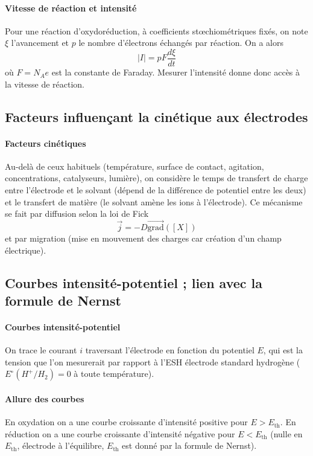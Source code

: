 \documentclass[french]{book}
\theoremstyle{plain}
\theoremstyle{definition}
\theoremstyle{remark}
\newcommand{\grad}{\overrightarrow{\text{grad}}}
\begin{document}
\paragraph{Vitesse de réaction et intensité} Pour une réaction d’oxydoréduction, à coefficients stœchiométriques fixés, on note $\xi$ l’avancement et $p$ le nombre d’électrons échangés par réaction. On a alors $$\lvert I\rvert=pF\frac{d\xi}{dt}$$ où $F=N_Ae$ est la constante de Faraday. Mesurer l’intensité donne donc accès à la vitesse de réaction.

\subsection{Facteurs influençant la cinétique aux électrodes}

\paragraph{Facteurs cinétiques} Au-delà de ceux habituels (température, surface de contact, agitation, concentrations, catalyseurs, lumière), on considère le temps de transfert de charge entre l’électrode et le solvant (dépend de la différence de potentiel entre les deux) et le transfert de matière (le solvant amène les ions à l’électrode). Ce mécanisme se fait par diffusion selon la loi de Fick $$\overrightarrow{j}=-D\grad([X])$$ et par migration (mise en mouvement des charges car création d’un champ électrique).

\subsection{Courbes intensité-potentiel ; lien avec la formule de Nernst}

\paragraph{Courbes intensité-potentiel} On trace le courant $i$ traversant l’électrode en fonction du potentiel $E$, qui est la tension que l’on mesurerait par rapport à l’ESH électrode standard hydrogène ($E^\circ(H^+/H_2)=0$ à toute température).

\paragraph{Allure des courbes } En oxydation on a une courbe croissante d’intensité positive pour $E>E_\text{th}$. En réduction on a une courbe croissante d'intensité négative pour $E<E_{\text{th}}$ (nulle en $E_\text{th}$, électrode à l’équilibre, $E_\text{th}$ est donné par la formule de Nernst).
\end{document}
